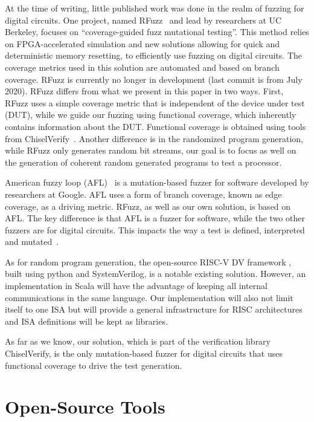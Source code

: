 \documentclass[conference]{IEEEtran}
\begin{document}
At the time of writing, little published work was done in the realm of fuzzing for digital circuits.
One project, named RFuzz~\cite{rfuzz2018} and lead by researchers at UC Berkeley, focuses on ``coverage-guided fuzz mutational testing''. This method relies on FPGA-accelerated simulation and new solutions allowing for quick and deterministic memory resetting, to efficiently use fuzzing on digital circuits. The coverage metrics used in this solution are automated and based on branch coverage. RFuzz is currently no longer in development (last commit is from July 2020). RFuzz differs from what we present in this paper in two ways. First, RFuzz uses a simple coverage metric that is independent of the device under test (DUT), while we guide our fuzzing using functional coverage, which inherently contains information about the DUT. Functional coverage is obtained using tools from ChiselVerify~\cite{verify:chisel:2020, dobis2021opensource}.
Another difference is in the randomized program generation, while RFuzz only generates random bit streams, our goal is to focus as well on the generation of coherent random generated programs to test a processor.

American fuzzy loop (AFL)~\cite{afl:repo} is a mutation-based fuzzer for software developed by researchers at Google. 
AFL uses a form of branch coverage, known as edge coverage, as a driving metric.
RFuzz, as well as our own solution, is based on AFL. 
The key difference is that AFL is a fuzzer for software, while the two other fuzzers are for digital circuits.
This impacts the way a test is defined, interpreted and mutated~\cite{rfuzz2018}.

As for random program generation, the open-source RISC-V DV framework \cite{riscvdv}, built using python and SystemVerilog, is a notable existing solution. 
However, an implementation in Scala will have the advantage of keeping all internal communications in the same language. 
Our implementation will also not limit itself to one ISA but will provide a general infrastructure for RISC architectures and ISA definitions will be kept as libraries.

As far as we know, our solution, which is part of the verification library ChiselVerify, is the only mutation-based fuzzer for digital circuits that uses functional coverage to drive the test generation.

\section{Open-Source Tools}
\label{sec:tools}
\end{document}
